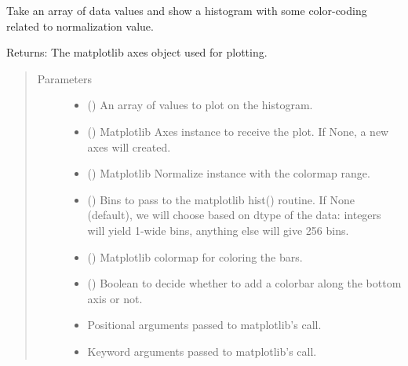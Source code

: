 \documentclass[letterpaper,10pt,english]{sphinxmanual}
\begin{document}

\begin{fulllineitems}
\label{\detokenize{xanespy:xanespy.plots.plot_txm_histogram}}
Take an array of data values and show a histogram with some
color-coding related to normalization value.

Returns: The matplotlib axes object used for plotting.
\begin{quote}\begin{description}
\item[{Parameters}] \leavevmode\begin{itemize}
\item {} 
 () \textendash{} An array of values to plot on the histogram.

\item {} 
 () \textendash{} Matplotlib Axes instance to receive the plot. If None, a new axes
will created.

\item {} 
 () \textendash{} Matplotlib Normalize instance with the colormap range.

\item {} 
 () \textendash{} Bins to pass to the matplotlib hist() routine. If None
(default), we will choose based on dtype of the data: integers
will yield 1-wide bins, anything else will give 256 bins.

\item {} 
 (\sphinxstyleliteralemphasis{, }) \textendash{} Matplotlib colormap for coloring the bars.

\item {} 
 (\sphinxstyleliteralemphasis{, }) \textendash{} Boolean to decide whether to add a colorbar along the
bottom axis or not.

\item {} 
 \textendash{} Positional arguments passed to matplotlib’s  call.

\item {} 
 \textendash{} Keyword arguments passed to matplotlib’s  call.

\end{itemize}

\end{description}\end{quote}

\end{fulllineitems}
\end{document}
